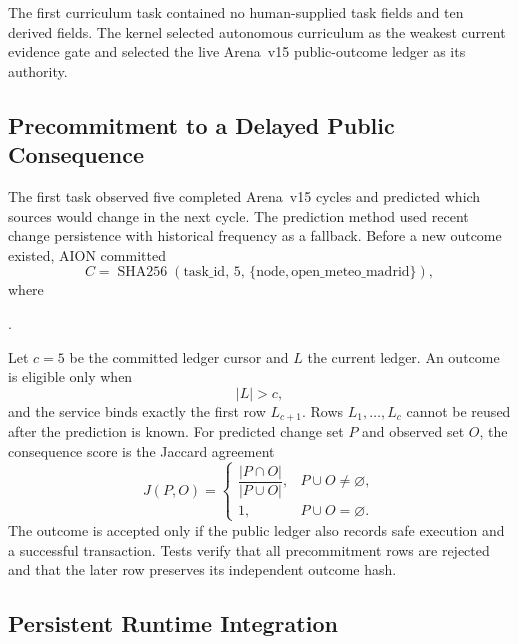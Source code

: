 The first curriculum task contained no human-supplied task fields and ten
derived fields.  The kernel selected autonomous curriculum as the weakest
current evidence gate and selected the live Arena~v15 public-outcome ledger as
its authority.

\subsection{Precommitment to a Delayed Public Consequence}
\label{subsec:apprentice-delayed-public-outcome}

The first task observed five completed Arena~v15 cycles and predicted which
sources would change in the next cycle.  The prediction method used recent
change persistence with historical frequency as a fallback.  Before a new
outcome existed, AION committed
\begin{equation}
C=\operatorname{SHA256}
\left(\mathrm{task\_id},\,5,\,
\{\text{node},\text{open\_meteo\_madrid}\}\right),
\end{equation}
where
\begin{center}
.
\end{center}

Let $c=5$ be the committed ledger cursor and $L$ the current ledger.  An outcome
is eligible only when
\begin{equation}
|L|>c,
\end{equation}
and the service binds exactly the first row $L_{c+1}$.  Rows $L_1,\ldots,L_c$
cannot be reused after the prediction is known.  For predicted change set $P$
and observed set $O$, the consequence score is the Jaccard agreement
\begin{equation}
J(P,O)=
\begin{cases}
\dfrac{|P\cap O|}{|P\cup O|}, & P\cup O\neq\varnothing,\\[6pt]
1, & P\cup O=\varnothing.
\end{cases}
\label{eq:apprentice-delayed-score}
\end{equation}
The outcome is accepted only if the public ledger also records safe execution
and a successful transaction.  Tests verify that all precommitment rows are
rejected and that the later row preserves its independent outcome hash.

\subsection{Persistent Runtime Integration}
\label{subsec:general-apprentice-runtime-integration}

